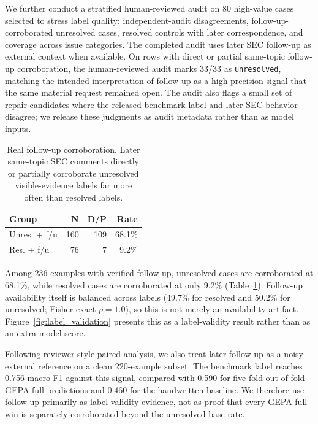 \documentclass[11pt]{article}
\begin{document}
We further conduct a stratified human-reviewed audit on 80 high-value cases selected to stress label quality: independent-audit disagreements, follow-up-corroborated unresolved cases, resolved controls with later correspondence, and coverage across issue categories. The completed audit uses later SEC follow-up as external context when available. On rows with direct or partial same-topic follow-up corroboration, the human-reviewed audit marks 33/33 as \texttt{unresolved}, matching the intended interpretation of follow-up as a high-precision signal that the same material request remained open. The audit also flags a small set of repair candidates where the released benchmark label and later SEC behavior disagree; we release these judgments as audit metadata rather than as model inputs.

\begin{table}[t]
\centering
\scriptsize
\setlength{\tabcolsep}{2pt}
\begin{tabular}{lrrr}
\toprule
\textbf{Group} & \textbf{N} & \textbf{D/P} & \textbf{Rate} \\
\midrule
Unres. + f/u & 160 & 109 & 68.1\% \\
Res. + f/u & 76 & 7 & 9.2\% \\
\bottomrule
\end{tabular}
\caption{Real follow-up corroboration. Later same-topic SEC comments directly or partially corroborate unresolved visible-evidence labels far more often than resolved labels.}
\label{tab:followup}
\end{table}

Among 236 examples with verified follow-up, unresolved cases are corroborated at 68.1\%, while resolved cases are corroborated at only 9.2\% (Table~\ref{tab:followup}). Follow-up availability itself is balanced across labels (49.7\% for resolved and 50.2\% for unresolved; Fisher exact $p=1.0$), so this is not merely an availability artifact. Figure~\ref{fig:label_validation} presents this as a label-validity result rather than as an extra model score.

Following reviewer-style paired analysis, we also treat later follow-up as a noisy external reference on a clean 220-example subset. The benchmark label reaches 0.756 macro-F1 against this signal, compared with 0.590 for five-fold out-of-fold GEPA-full predictions and 0.460 for the handwritten baseline. We therefore use follow-up primarily as label-validity evidence, not as proof that every GEPA-full win is separately corroborated beyond the unresolved base rate.
\end{document}
